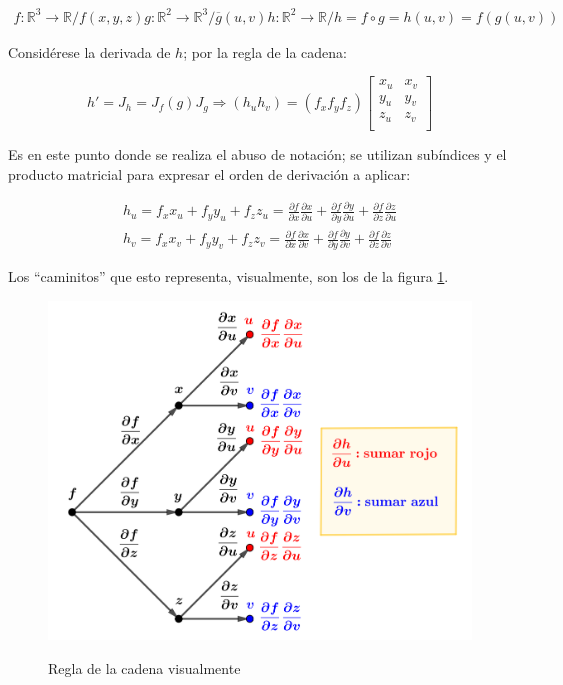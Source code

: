 \documentclass{article}
\renewcommand{\Bbb}{\mathbb}
\begin{document}
\begin{gather}
f: \Bbb R^3 \rightarrow \Bbb R / f(x, y, z)
g: \Bbb R^2 \rightarrow \Bbb R^3 / \overline{g}(u, v)
h: \Bbb R^2 \rightarrow \Bbb R / h = f \circ g = h(u, v) = f(g(u,v))
\end{gather}

Considérese la derivada de $h$; por la regla de la cadena:

\begin{equation}
h' = J_h = J_f(g) J_g \Rightarrow (h_u h_v) = (f_x f_y f_z) 
\begin{bmatrix}
x_u & x_v \\
y_u & y_v \\
z_u & z_v \\
\end{bmatrix}
\end{equation}

Es en este punto donde se realiza el abuso de notación; se utilizan subíndices y el producto matricial para expresar el orden de derivación a aplicar:

\begin{subequations}
\begin{gather}
h_u = f_x x_u + f_y y_u + f_z z_u = \frac{\partial f}{\partial x} \frac{\partial x}{\partial u} + \frac{\partial f}{\partial y} \frac{\partial y}{\partial u} + \frac{\partial f}{\partial z} \frac{\partial z}{\partial u} \\
h_v = f_x x_v + f_y y_v + f_z z_v = \frac{\partial f}{\partial x} \frac{\partial x}{\partial v} + \frac{\partial f}{\partial y} \frac{\partial y}{\partial v} + \frac{\partial f}{\partial z} \frac{\partial z}{\partial v}
\end{gather}
\end{subequations}

Los ``caminitos'' que esto representa, visualmente, son los de la figura \ref{fig:rc2}.

\begin{figure}[ht]
\caption{Regla de la cadena visualmente}
\includegraphics[scale=0.7]{img/derivadas/rc_visual.png} 
\centering
\label{fig:rc2}
\end{figure}
\end{document}

